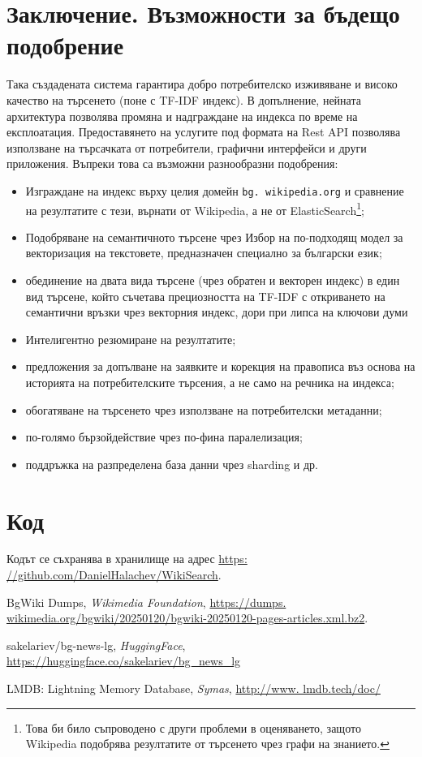 \documentclass[a4paper,12pt]{article} \usepackage[utf8]{inputenc}
\begin{document}
\section{Заключение. Възможности за бъдещо подобрение} Така създадената система
гарантира добро потребителско изживяване и високо качество на търсенето (поне с
TF-IDF индекс). В допълнение, нейната архитектура позволява промяна и
надграждане на индекса по време на експлоатация. Предоставянето на услугите под
формата на Rest API позволява използване на търсачката от потребители, графични
интерфейси и други приложения. Въпреки това са възможни разнообразни подобрения:
\begin{itemize} \item Изграждане на индекс върху целия домейн \texttt{bg.
wikipedia.org} и сравнение на резултатите с тези, върнати от Wikipedia, а не от
ElasticSearch\footnote{Това би било съпроводено с други проблеми в оценяването,
защото Wikipedia подобрява резултатите от търсенето чрез графи на знанието.};
\item Подобряване на семантичното търсене чрез Избор на по-подходящ модел за
векторизация на текстовете, предназначен специално за български език; \item
обединение на двата вида търсене (чрез обратен и векторен индекс) в един вид
търсене, който съчетава прециозността на TF-IDF с откриването на семантични
връзки чрез векторния индекс, дори при липса на ключови думи \item Интелигентно
резюмиране на резултатите; \item предложения за допълване на заявките и корекция
на правописа въз основа на историята на потребителските търсения, а не само на
речника на индекса; \item обогатяване на търсенето чрез използване на
потребителски метаданни; \item по-голямо бързойдействие чрез по-фина
паралелизация; \item поддръжка на разпределена база данни чрез sharding и др.
\end{itemize} \section{Код} Кодът се съхранява в хранилище на адрес \url{https:
//github.com/DanielHalachev/WikiSearch}. \begin{thebibliography}{9}
 BgWiki Dumps, \textit{Wikimedia Foundation}, \url{https://dumps.
wikimedia.org/bgwiki/20250120/bgwiki-20250120-pages-articles.xml.bz2}.

 sakelariev/bg-news-lg, \textit{HuggingFace},
\url{https://huggingface.co/sakelariev/bg_news_lg}

 LMDB: Lightning Memory Database, \textit{Symas}, \url{http://www.
lmdb.tech/doc/} \end{thebibliography} 
\end{document}
